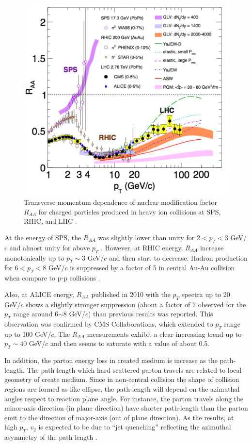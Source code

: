 \begin{figure}[!t]
\centerline{\includegraphics[width=12.0cm]{figures/raa}}
\caption{ Transverse momentum dependence of nuclear modification factor $R_{AA}$ for charged particles produced in heavy ion collisions at SPS, RHIC, and LHC \cite{Roland201470}.} 
\label{fig:RAA}
\end{figure}

    At the energy of SPS, the $R_{AA}$ was slightly lower than unity for $2 < p_T < 3$ GeV/$c$ and almost unity for above $p_T$ \cite{Aggarwaletal.2002}.   However, at RHIC energy, $R_{AA}$ increase monotonically up to $p_T \sim 3$ GeV/$c$ and then start to decrease. Hadron production for $6 < p_T < 8$ GeV/$c$ is suppressed by a factor of 5 in central Au-Au collision when compare to p-p collisions \cite{PhysRevLett.101.232301, PhysRevLett.91.172302}.
    
   Also, at ALICE energy, $R_{AA}$ published in 2010 with the $p_T$ spectra up to 20 GeV/$c$ shows a slightly stronger suppression (about a factor of 7 observed for the $p_T$ range around 6$\sim$8 GeV/$c$) than previous results was reported.  This observation was confirmed by CMS Collaborations, which extended to $p_T$ range up to 100 GeV/$c$. The $R_{AA}$ measurements exhibit a clear increasing trend up to $p_T \sim 40$ GeV/$c$ and then seems to saturate with a value of about 0.5. 
   
   
    In addition, the parton energy loss in created medium is increase as the path-length. The path-length which hard scattered parton travels are related to local geometry of create medium. Since in non-central collision the shape of collision regions are formed as like ellipse, the path-length will depend on the azimuthal angles respect to reaction plane angle. For instance, the parton travels along the minor-axis direction (in plane direction) have shorter path-length than the parton emit to the direction of major-axis (out of plane direction). As the results, at high $p_T$, $v_2$ is expected to be due to ``jet quenching'' reflecting the azimuthal asymmetry of the path-length \cite{Christiansen:2016uaq}.
    
